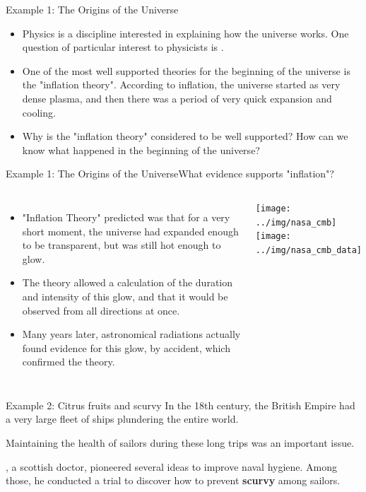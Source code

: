 \begin{frame}{Example 1: The Origins of the Universe}
  \begin{itemize}
    \item Physics is a discipline interested in explaining how the universe works. One question of particular interest to physicists is .\bigskip

    \item One of the most well supported theories for the beginning of the universe is the "inflation theory". According to inflation, the universe started as very dense plasma, and then there was a period of very quick expansion and cooling.\bigskip

    \item Why is the "inflation theory" considered to be well supported? How can we know what happened in the beginning of the universe?
  \end{itemize}
\end{frame}

\begin{frame}{Example 1: The Origins of the Universe}{What evidence supports "inflation"?}

  \begin{columns}

    \begin{itemize}
      \item "Inflation Theory" predicted was that for a very short moment,  the universe had expanded enough to be transparent, but was still hot enough to glow.\medskip

      \item The theory allowed a calculation of the duration and intensity of this glow, and that it would be observed from all directions at once.\medskip

      \item Many years later, astronomical radiations actually found evidence for this glow, by accident, which confirmed the theory.\medskip
    \end{itemize}

    \texttt{[image: ../img/nasa\_cmb]}
    \texttt{[image: ../img/nasa\_cmb\_data]}\\

  \end{columns}
\end{frame}

\begin{frame}{Example 2: Citrus fruits and scurvy}
  In the 18th century, the British Empire had a very large fleet of ships plundering the entire world.\bigskip

  Maintaining the health of sailors during these long trips was an important issue.\bigskip

  , a scottish doctor, pioneered several ideas to improve naval hygiene. Among those, he conducted a trial to discover how to prevent {\bf scurvy} among sailors.
\end{frame}

